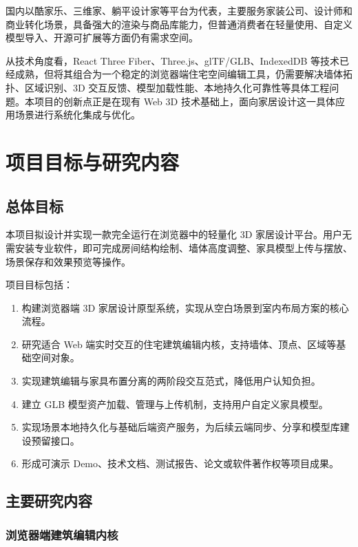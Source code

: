\documentclass[UTF8,fontset=fandol,zihao=-4]{ctexart}
\begin{document}
国内以酷家乐、三维家、躺平设计家等平台为代表，主要服务家装公司、设计师和商业转化场景，具备强大的渲染与商品库能力，但普通消费者在轻量使用、自定义模型导入、开源可扩展等方面仍有需求空间。

从技术角度看，React Three Fiber、Three.js、glTF/GLB、IndexedDB 等技术已经成熟，但将其组合为一个稳定的浏览器端住宅空间编辑工具，仍需要解决墙体拓扑、区域识别、3D 交互反馈、模型加载性能、本地持久化可靠性等具体工程问题。本项目的创新点正是在现有 Web 3D 技术基础上，面向家居设计这一具体应用场景进行系统化集成与优化。

\section{项目目标与研究内容}

\subsection{总体目标}

本项目拟设计并实现一款完全运行在浏览器中的轻量化 3D 家居设计平台。用户无需安装专业软件，即可完成房间结构绘制、墙体高度调整、家具模型上传与摆放、场景保存和效果预览等操作。

项目目标包括：

\begin{enumerate}
  \item 构建浏览器端 3D 家居设计原型系统，实现从空白场景到室内布局方案的核心流程。
  \item 研究适合 Web 端实时交互的住宅建筑编辑内核，支持墙体、顶点、区域等基础空间对象。
  \item 实现建筑编辑与家具布置分离的两阶段交互范式，降低用户认知负担。
  \item 建立 GLB 模型资产加载、管理与上传机制，支持用户自定义家具模型。
  \item 实现场景本地持久化与基础后端资产服务，为后续云端同步、分享和模型库建设预留接口。
  \item 形成可演示 Demo、技术文档、测试报告、论文或软件著作权等项目成果。
\end{enumerate}

\subsection{主要研究内容}

\subsubsection{浏览器端建筑编辑内核}
\end{document}
